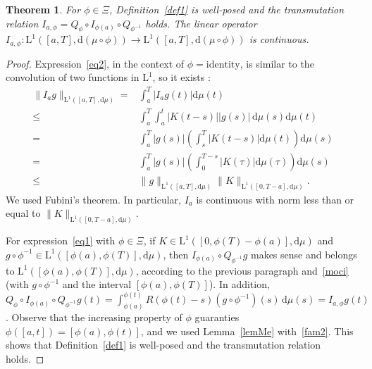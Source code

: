 \documentclass[12pt,reqno]{amsart}
\theoremstyle{plain}
\newtheorem{theorem}{Theorem}[section] %
\numberwithin{equation}{section} %
\begin{document}
\begin{theorem} \label{th_prin}
For $\phi\in\Xi$, Definition~\ref{def1} is well-posed and the transmutation relation $I_{a,\phi}=Q_\phi\circ I_{\phi(a)}\circ Q_{\phi^{-1}}$ holds. The linear operator $I_{a,\phi}:\mathrm{L}^1([a,T],\mathrm{d}(\mu\circ\phi))\rightarrow \mathrm{L}^1([a,T],\mathrm{d}(\mu\circ\phi))$ is continuous.
\end{theorem}
\begin{proof}
Expression~\eqref{eq2}, in the context of $\phi=\text{identity}$, is similar to the convolution of two functions in $\mathrm{L}^1$, so it exists \cite[Proposition~1.25]{tese}:
\begin{equation}
\begin{split}
\| I_{a}g\|_{\mathrm{L}^1([a,T],\mathrm{d}\mu)}= {} & \int_a^T |I_a g(t)|\mathrm{d}\mu(t) \\
\leq {} & \int_a^T \int_{a}^{t} |K(t-s)||g(s)|\,\mathrm{d}\mu(s)\mathrm{d}\mu(t) \\
= {} & \int_a^T |g(s)|\left(\int_s^T |K(t-s)|\mathrm{d}\mu(t)\right)\mathrm{d}\mu(s) \\
= {} & \int_a^T |g(s)|\left(\int_0^{T-s} |K(\tau)|\mathrm{d}\mu(\tau)\right)\mathrm{d}\mu(s) \\
\leq {} & \|g\|_{\mathrm{L}^1([a,T],\mathrm{d}\mu)}\|K\|_{\mathrm{L}^1([0,T-a],\mathrm{d}\mu)}.
\end{split}
\label{moci}
\end{equation}
We used Fubini's theorem. In particular, $I_a$ is continuous with norm less than or equal to $\|K\|_{\mathrm{L}^1([0,T-a],\mathrm{d}\mu)}$.

For expression~\eqref{eq1} with $\phi\in\Xi$, if $K\in\mathrm{L}^1([0,\phi(T)-\phi(a)],\mathrm{d}\mu)$ and $g\circ\phi^{-1}\in\mathrm{L}^1([\phi(a),\phi(T)],\mathrm{d}\mu)$, then $I_{\phi(a)} \circ Q_{\phi^{-1}}g$ makes sense and belongs to $\mathrm{L}^1([\phi(a),\phi(T)],\mathrm{d}\mu)$, according to the previous paragraph and~\eqref{moci} (with $g\circ\phi^{-1}$ and the interval $[\phi(a),\phi(T)]$). In addition, $Q_\phi \circ I_{\phi(a)}\circ Q_{\phi^{-1}}g(t)=  \int_{\phi(a)}^{\phi(t)}R(\phi(t)-s)(g\circ\phi^{-1})(s)\,\mathrm{d}\mu(s) 
= I_{a,\phi}g(t)$. Observe that the increasing property of $\phi$ guaranties $\phi([a,t])=[\phi(a),\phi(t)]$, and we used Lemma~\ref{lemMe} with~\eqref{fam2}. This shows that Definition~\ref{def1} is well-posed and the transmutation relation holds.


\end{proof}
\end{document}

